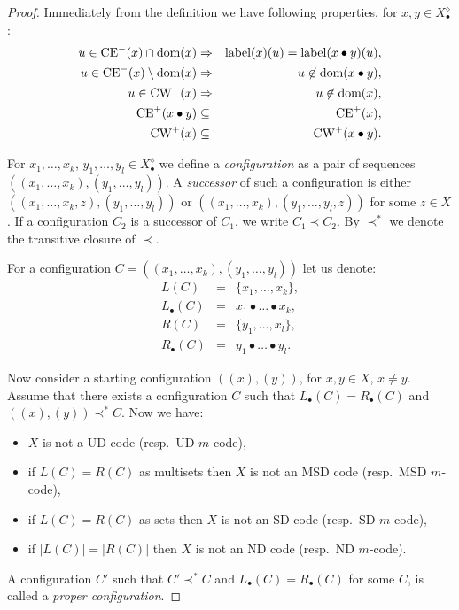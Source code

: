 \documentclass[final,nomarks]{dmtcs-episciences}
\newcommand{\DFX}[1]{#1^{\diamond}_{\bullet}}
\newcommand{\dflabel}[1]{\mbox{\rm label}(#1)}
\newcommand{\dfdomain}[1]{\mbox{\rm dom}(#1)}
\newcommand{\CEP}[1]{\mbox{\rm CE}^+(#1)}\newcommand{\CEN}[1]{\mbox{\rm CE}^-(#1)}\newcommand{\CWP}[1]{\mbox{\rm CW}^+(#1)}\newcommand{\CWN}[1]{\mbox{\rm CW}^-(#1)}\newcommand{\B}[2]{\mbox{\rm B}(#1,#2)}\newcommand{\HP}[2]{\mbox{\rm HP}(#1,#2)}\newcommand{\R}[2]{\mbox{\rm Rot}_{#1}(#2)}\newcommand{\tr}[1]{\mathrm{tr}_{#1}}
\begin{document}
\begin{proof}
Immediately from the definition we have following properties, for $x,y\in\DFX{X}$:
\begin{eqnarray*}
   \label{prop:ce-1}u\in \CEN{x}\cap\dfdomain{x}&\Rightarrow&\dflabel{x}(u)=\dflabel{x\bullet y}(u),\\
   \label{prop:ce-2}u\in \CEN{x}\setminus\dfdomain{x}&\Rightarrow&u\not\in\dfdomain{x\bullet y},\\
   u\in \CWN{x}&\Rightarrow&u\not\in\dfdomain{x},\\
   \CEP{x\bullet y}&\subseteq&\CEP{x},\\
   \CWP{x}&\subseteq&\CWP{x\bullet y}.
\end{eqnarray*}


For $x_1,\ldots,x_k$, $y_1,\ldots,y_l\in\DFX{X}$ we define a
\emph{configuration} as a pair of sequences
$((x_1,\ldots,x_k),(y_1,\ldots,y_l))$. A \emph{successor} of
such a configuration is either
$((x_1,\ldots,x_k,z),(y_1,\ldots,y_l))$ or
$((x_1,\ldots,x_k),(y_1,\ldots,y_l,z))$ for some $z\in X$. If a
configuration $C_2$ is a successor of $C_1$, we write $C_1\prec
C_2$. By $\prec^*$ we denote the transitive closure of $\prec$.

For a configuration $C=((x_1,\ldots,x_k),(y_1,\ldots,y_l))$ let
us denote:
\begin{eqnarray*}
	L(C)&=&\{x_1,\ldots,x_k\},\\
	L_{\bullet}(C)&=&x_1\bullet\ldots\bullet x_k,\\
	R(C)&=&\{y_1,\ldots,x_l\},\\
	R_{\bullet}(C)&=&y_1\bullet\ldots\bullet y_l.
\end{eqnarray*}


Now consider a starting configuration $((x),(y))$, for $x,y\in
X$, $x \neq y$. Assume that there exists a configuration $C$
such that $L_{\bullet}(C)=R_{\bullet}(C)$ and
$((x),(y))\prec^*C$. Now we have:
\begin{itemize}
\item $X$ is not a UD code (resp.\ UD $m$-code),
\item if $L(C)=R(C)$ as multisets then $X$ is not an MSD code (resp.\ MSD $m$-code),
\item if $L(C)=R(C)$ as sets then $X$ is not an SD code (resp.\ SD $m$-code),
\item if $|L(C)|=|R(C)|$ then $X$ is not an ND code (resp.\ ND $m$-code).
\end{itemize}
A configuration $C'$ such that $C'\prec^*C$ and $L_{\bullet}(C)=R_{\bullet}(C)$  for some $C$, is called a \emph{proper configuration}.


\end{proof}
\end{document}
